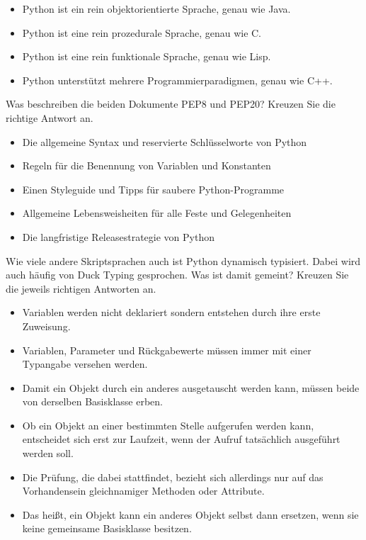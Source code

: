 \begin{itemize}
    \renewcommand{\labelitemi}{$\square$}
    \item Python ist ein rein objektorientierte Sprache, genau wie Java.
    \item Python ist eine rein prozedurale Sprache, genau wie C.
    \item Python ist eine rein funktionale Sprache, genau wie Lisp.
    \item Python unterstützt mehrere Programmierparadigmen, genau wie C++.
\end{itemize}

\teilaufgabe
Was beschreiben die beiden Dokumente PEP8 und PEP20? Kreuzen Sie die richtige
Antwort an.

\begin{itemize}
    \renewcommand{\labelitemi}{$\square$}
    \item Die allgemeine Syntax und reservierte Schlüsselworte von Python
    \item Regeln für die Benennung von Variablen und Konstanten
    \item Einen Styleguide und Tipps für saubere Python-Programme
    \item Allgemeine Lebensweisheiten für alle Feste und Gelegenheiten
    \item Die langfristige Releasestrategie von Python
\end{itemize}

\teilaufgabe
Wie viele andere Skriptsprachen auch ist Python dynamisch typisiert. Dabei wird
auch häufig von \glqq{}Duck Typing\grqq{} gesprochen. Was ist damit gemeint?
Kreuzen Sie die jeweils richtigen Antworten an.

\begin{itemize}
    \renewcommand{\labelitemi}{$\square$}
    \item Variablen werden nicht deklariert sondern entstehen durch ihre erste Zuweisung.
    \item Variablen, Parameter und Rückgabewerte müssen immer mit einer Typangabe versehen werden.
    \item Damit ein Objekt durch ein anderes ausgetauscht werden kann, müssen beide von derselben Basisklasse erben.
    \item Ob ein Objekt an einer bestimmten Stelle aufgerufen werden kann, entscheidet sich erst zur Laufzeit,
    wenn der Aufruf tatsächlich ausgeführt werden soll.
    \item Die Prüfung, die dabei stattfindet, bezieht sich allerdings nur auf das Vorhandensein
    gleichnamiger Methoden oder Attribute.
    \item Das heißt, ein Objekt kann ein anderes Objekt selbst dann ersetzen,
    wenn sie keine gemeinsame Basisklasse besitzen.
\end{itemize}

